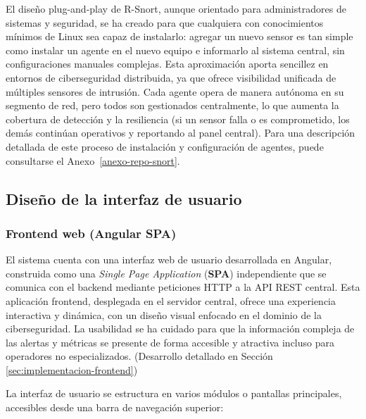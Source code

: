 \documentclass[11pt,a4paper,twoside]{report}
\newcounter{anexo}
\begin{document}
El diseño plug-and-play de R-Snort, aunque orientado para administradores de sistemas y seguridad, se ha creado para que cualquiera con conocimientos mínimos de Linux sea capaz de instalarlo: agregar un nuevo sensor es tan simple como instalar un agente en el nuevo equipo e informarlo al sistema central, sin configuraciones manuales complejas. Esta aproximación aporta sencillez en entornos de ciberseguridad distribuida, ya que ofrece visibilidad unificada de múltiples sensores de intrusión. Cada agente opera de manera autónoma en su segmento de red, pero todos son gestionados centralmente, lo que aumenta la cobertura de detección y la resiliencia (si un sensor falla o es comprometido, los demás continúan operativos y reportando al panel central). Para una descripción detallada de este proceso de instalación y configuración de agentes, puede consultarse el Anexo~\ref{anexo-repo-snort}.

\subsection{Diseño de la interfaz de usuario}

\subsubsection{Frontend web (Angular SPA)}

El sistema cuenta con una interfaz web de usuario desarrollada en Angular, construida como una \emph{Single Page Application} (\textbf{SPA}) independiente que se comunica con el backend mediante peticiones HTTP a la API REST central. Esta aplicación frontend, desplegada en el servidor central, ofrece una experiencia interactiva y dinámica, con un diseño visual enfocado en el dominio de la ciberseguridad. La usabilidad se ha cuidado para que la información compleja de las alertas y métricas se presente de forma accesible y atractiva incluso para operadores no especializados. (Desarrollo detallado en Sección \ref{sec:implementacion-frontend})\newline

La interfaz de usuario se estructura en varios módulos o pantallas principales, accesibles desde una barra de navegación superior:\newline
\end{document}
